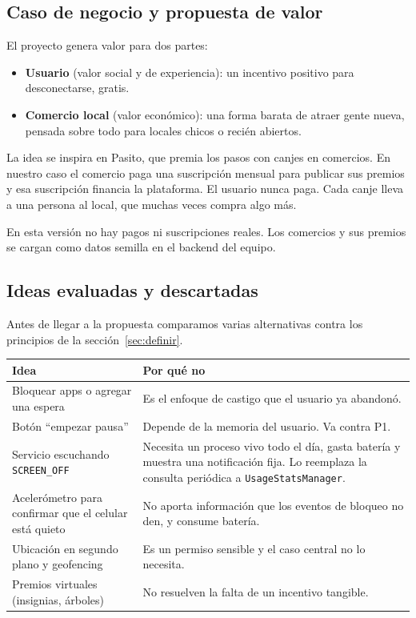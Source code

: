 \subsection{Caso de negocio y propuesta de valor}

El proyecto genera valor para dos partes:

\begin{itemize}
\item \textbf{Usuario} (valor social y de experiencia): un incentivo positivo para desconectarse, gratis.
\item \textbf{Comercio local} (valor económico): una forma barata de atraer gente nueva, pensada sobre todo para locales chicos o recién abiertos.
\end{itemize}

La idea se inspira en Pasito, que premia los pasos con canjes en comercios. En nuestro caso el comercio paga una suscripción mensual para publicar sus premios y esa suscripción financia la plataforma. El usuario nunca paga. Cada canje lleva a una persona al local, que muchas veces compra algo más.

En esta versión no hay pagos ni suscripciones reales. Los comercios y sus premios se cargan como datos semilla en el backend del equipo.

\subsection{Ideas evaluadas y descartadas}

Antes de llegar a la propuesta comparamos varias alternativas contra los principios de la sección~\ref{sec:definir}.

\begin{table}[H]
\centering\small
\begin{tabularx}{\textwidth}{@{}l L@{}}
\toprule
\textbf{Idea} & \textbf{Por qué no} \\
\midrule
Bloquear apps o agregar una espera & Es el enfoque de castigo que el usuario ya abandonó. \\
Botón “empezar pausa” & Depende de la memoria del usuario. Va contra P1. \\
Servicio escuchando \texttt{SCREEN\_OFF} & Necesita un proceso vivo todo el día, gasta batería y muestra una notificación fija. Lo reemplaza la consulta periódica a \texttt{UsageStatsManager}. \\
Acelerómetro para confirmar que el celular está quieto & No aporta información que los eventos de bloqueo no den, y consume batería. \\
Ubicación en segundo plano y geofencing & Es un permiso sensible y el caso central no lo necesita. \\
Premios virtuales (insignias, árboles) & No resuelven la falta de un incentivo tangible. \\
\bottomrule
\end{tabularx}
\end{table}

